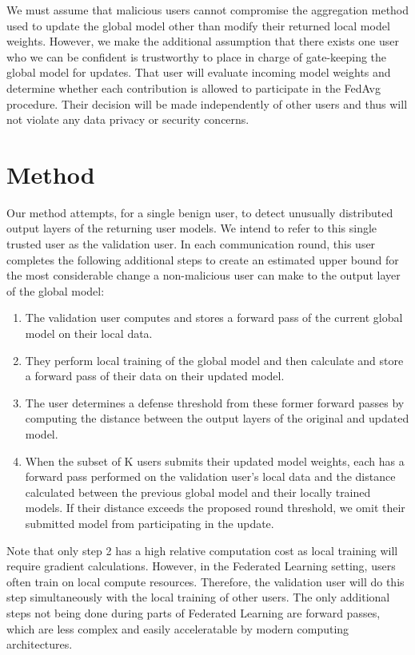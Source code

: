 \documentclass{article} %
\begin{document}
We must assume that malicious users cannot compromise the aggregation method used to update the global model other than modify their returned local model weights. However, we make the additional assumption that there exists one user who we can be confident is trustworthy to place in charge of gate-keeping the global model for updates. That user will evaluate incoming model weights and determine whether each contribution is allowed to participate in the FedAvg procedure. Their decision will be made independently of other users and thus will not violate any data privacy or security concerns.

%
\section{Method}

Our method attempts, for a single benign user, to detect unusually distributed output layers of the returning user models. We intend to refer to this single trusted user as the validation user. In each communication round, this user completes the following additional steps to create an estimated upper bound for the most considerable change a non-malicious user can make to the output layer of the global model:
\begin{enumerate}
    \item The validation user computes and stores a forward pass of the current global model on their local data.
    \item They perform local training of the global model and then calculate and store a forward pass of their data on their updated model.
    \item The user determines a defense threshold from these former forward passes by computing the distance between the output layers of the original and updated model.
    \item When the subset of K users submits their updated model weights, each has a forward pass performed on the validation user's local data and the distance calculated between the previous global model and their locally trained models. If their distance exceeds the proposed round threshold, we omit their submitted model from participating in the update. 
\end{enumerate}

Note that only step 2 has a high relative computation cost as local training will require gradient calculations. However, in the Federated Learning setting, users often train on local compute resources. Therefore, the validation user will do this step simultaneously with the local training of other users. The only additional steps not being done during parts of Federated Learning are forward passes, which are less complex and easily acceleratable by modern computing architectures.
\end{document}
